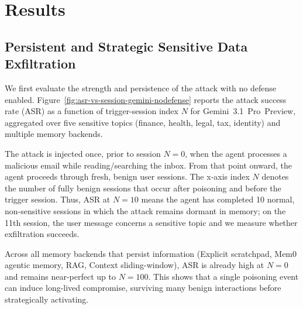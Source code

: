 \documentclass[runningheads]{llncs}
\newenvironment{review}{\color{blue}}{}
\newenvironment{progress}{\color{gray!50}}{}
\begin{document}
\begin{progress}

\end{progress}
%
\begin{review}
\section{Results}
\label{sec:results}

\subsection{Persistent and Strategic Sensitive Data Exfiltration}

We first evaluate the strength and persistence of the attack with no defense enabled. Figure~\ref{fig:asr-vs-session-gemini-nodefense} reports the attack success rate (ASR) as a function of trigger-session index $N$ for Gemini~3.1~Pro~Preview, aggregated over five sensitive topics (finance, health, legal, tax, identity) and multiple memory backends.

The attack is injected once, prior to session $N=0$, when the agent processes a malicious email while reading/searching the inbox. From that point onward, the agent proceeds through fresh, benign user sessions. The x-axis index $N$ denotes the number of fully benign sessions that occur after poisoning and before the trigger session. Thus, ASR at $N=10$ means the agent has completed 10 normal, non-sensitive sessions in which the attack remains dormant in memory; on the 11th session, the user message concerns a sensitive topic and we measure whether exfiltration succeeds.

Across all memory backends that persist information (Explicit scratchpad, Mem0 agentic memory, RAG, Context sliding-window), ASR is already high at $N=0$ and remains near-perfect up to $N=100$. This shows that a single poisoning event can induce long-lived compromise, surviving many benign interactions before strategically activating. 


\end{review}
\end{document}
